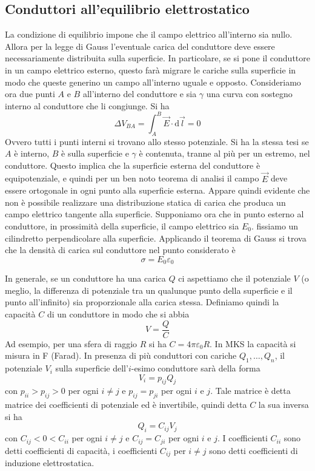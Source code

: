 \documentclass[a4paper,11pt]{book}
\newcommand{\dif}{\mathrm{d}}
\let\oldepsilon\epsilon
\let\oldvarepsilon\varepsilon
\renewcommand{\epsilon}{\oldvarepsilon}
\renewcommand{\varepsilon}{\oldepsilon}
\theoremstyle{definition}
\theoremstyle{theorem}
\begin{document}
	\subsection{Conduttori all'equilibrio elettrostatico}
	La condizione di equilibrio impone che il campo elettrico all'interno sia nullo. Allora per la legge di Gauss l'eventuale carica del conduttore deve essere necessariamente distribuita sulla superficie. In particolare, se si pone il conduttore in un campo elettrico esterno, questo farà migrare le cariche sulla superficie in modo che queste generino un campo all'interno uguale e opposto. Consideriamo ora due punti $A$ e $B$ all'interno del conduttore e sia $\gamma$ una curva con sostegno interno al conduttore che li congiunge. Si ha
	\[\Delta V_{BA}=\int_{A}^{B}\vec{E}\cdot\dif\vec{l}=0\]
	Ovvero tutti i punti interni si trovano allo stesso potenziale. Si ha la stessa tesi se $A$ è interno, $B$ è sulla superficie e $\gamma$ è contenuta, tranne al più per un estremo, nel conduttore. Questo implica che la superficie esterna del conduttore è equipotenziale, e quindi per un ben noto teorema di analisi il campo $\vec{E}$ deve essere ortogonale in ogni punto alla superficie esterna. Appare quindi evidente che non è possibile realizzare una distribuzione statica di carica che produca un campo elettrico tangente alla superficie.
	Supponiamo ora che in punto esterno al conduttore, in prossimità della superficie, il campo elettrico sia $E_0$. fissiamo un cilindretto perpendicolare alla superficie. Applicando il teorema di Gauss si trova che la densità di carica sul conduttore nel punto considerato è
	\[\sigma=E_0\epsilon_0\]
	
	In generale, se un conduttore ha una carica $Q$ ci aspettiamo che il potenziale $V$ (o meglio, la differenza di potenziale tra un qualunque punto della superficie e il punto all'infinito) sia proporzionale alla carica stessa. Definiamo quindi la capacità $C$ di un conduttore in modo che si abbia
	\[V=\frac{Q}{C}\]
	Ad esempio, per una sfera di raggio $R$ si ha $C=4\pi\epsilon_0 R$. In MKS la capacità si misura in F (Farad). In presenza di più conduttori con cariche $Q_1,\dots,Q_n$, il potenziale $V_i$ sulla superficie dell'$i$-esimo conduttore sarà della forma
	\[V_i=p_{ij}Q_j\]
	con $p_{ii}>p_{ij}>0$ per ogni $i\neq j$ e $p_{ij}=p_{ji}$ per ogni $i$ e $j$. Tale matrice è detta matrice dei coefficienti di potenziale ed è invertibile, quindi detta $C$ la sua inversa si ha
	\[Q_i=C_{ij}V_j\]
	con $C_{ij}<0<C_{ii}$ per ogni $i\neq j$ e $C_{ij}=C_{ji}$ per ogni $i$ e $j$. I coefficienti $C_{ii}$ sono detti coefficienti di capacità, i coefficienti $C_{ij}$ per $i\neq j$ sono detti coefficienti di induzione elettrostatica.
	
\end{document}

